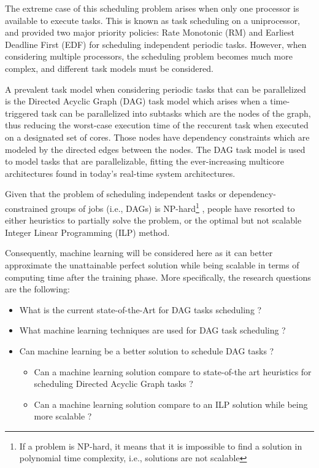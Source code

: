 The extreme case of this scheduling problem arises when only one 
processor is available to execute tasks. This is known as task 
scheduling on a uniprocessor, and \cite{liu1973scheduling} 
provided two major priority policies: Rate Monotonic (RM) and 
Earliest Deadline First (EDF) for scheduling independent periodic tasks. 
However, when considering multiple processors, the scheduling 
problem becomes much more complex, and different task models must 
be considered.

A prevalent task model when considering periodic tasks that can be parallelized is the 
Directed Acyclic Graph (DAG) task model which arises when a time-triggered task
can be parallelized into subtasks which are the nodes of the graph,
thus reducing the worst-case execution time of the reccurent task when executed on a designated set of cores.
Those nodes have dependency constraints which are modeled by the directed edges between the nodes.
The DAG task model is used to model tasks that are parallelizable\cite{baruah2012DAGdef},
fitting the ever-increasing multicore architectures found in today's real-time system architectures. 

Given that the problem of scheduling independent tasks or dependency-constrained groups of jobs (i.e., DAGs) is NP-hard\footnote{If a problem is 
NP-hard, it means that it is impossible to find a solution in 
polynomial time complexity, i.e., solutions are not scalable}\cite{du1989schedNPhard}
\cite{ULLMAN1975NPhard}, 
people have resorted to either heuristics 
to partially solve the problem,
or the optimal but not scalable Integer Linear Programming
(ILP) method.

Consequently, machine learning will be considered here as it can 
better approximate the unattainable perfect solution while being 
scalable in terms of computing time after the training phase\cite{Zhao2024GATDRLmodel}\cite{Lee2021GlobalDagSchedDRL}. 
More specifically, the research questions are the following:

\begin{itemize}
    \item [RQ1] What is the current state-of-the-Art for DAG tasks scheduling ?        
    \item [RQ2] What machine learning  techniques are used for DAG task scheduling ?
    \item [RQ3]  Can machine learning be a better solution to schedule DAG tasks ?
            \begin{itemize}
                \item [RQ3.1] Can a machine learning solution compare to state-of-the art heuristics for scheduling Directed Acyclic Graph tasks ?
                \item [RQ3.2] Can a machine learning solution compare to an ILP solution while being more scalable ?
            \end{itemize}    
\end{itemize}


